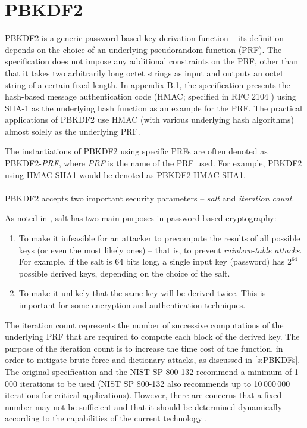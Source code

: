 \documentclass[12pt,oneside]{fithesis2}
\begin{document}
      \section{PBKDF2}\label{s:PBKDF2}
      PBKDF2 is a generic password-based key derivation function -- its definition depends on the choice of an underlying pseudorandom function (PRF). The specification \cite{rfc2898} does not impose any additional constraints on the PRF, other than that it takes two arbitrarily long octet strings as input and outputs an octet string of a certain fixed length. In appendix B.1, the specification presents the hash-based message authentication code (HMAC; specified in RFC 2104 \cite{rfc2104}) using SHA-1 as the underlying hash function as an example for the PRF. The practical applications of PBKDF2 use HMAC (with various underlying hash algorithms) almost solely as the underlying PRF.
      
      The instantiations of PBKDF2 using specific PRFs are often denoted as PBKDF2-\emph{PRF}, where \emph{PRF} is the name of the PRF used. For example, PBKDF2 using HMAC-SHA1 would be denoted as PBKDF2-HMAC-SHA1.
      
      \paragraph*{}
      PBKDF2 accepts two important security parameters -- \emph{salt} and \emph{iteration count}.
      
      As noted in \cite[section 4.1]{rfc2898}, salt has two main purposes in password-based cryptography:
      \begin{enumerate}
        \item To make it infeasible for an attacker to precompute the results of all possible keys (or even the most likely ones) -- that is, to prevent \emph{rainbow-table attacks}. For example, if the salt is 64 bits long, a single input key (password) has $2^{64}$ possible derived keys, depending on the choice of the salt.
        \item To make it unlikely that the same key will be derived twice. This is important for some encryption and authentication techniques.
      \end{enumerate}
      
      The iteration count represents the number of successive computations of the underlying PRF that are required to compute each block of the derived key. The purpose of the iteration count is to increase the time cost of the function, in order to mitigate brute-force and dictionary attacks, as discussed in \ref{s:PBKDFs}. The original specification \cite[section 4.2]{rfc2898} and the NIST SP 800-132 \cite[section 5.2]{nist:sp800:132} recommend a minimum of 1\,000 iterations to be used (NIST SP 800-132 also recommends up to 10\,000\,000 iterations for critical applications). However, there are concerns that a fixed number may not be sufficient and that it should be determined dynamically according to the capabilities of the current technology \cite[chapter 7]{Durmuth} \cite[footnotes 7, 8]{luks}.
      
\end{document}
